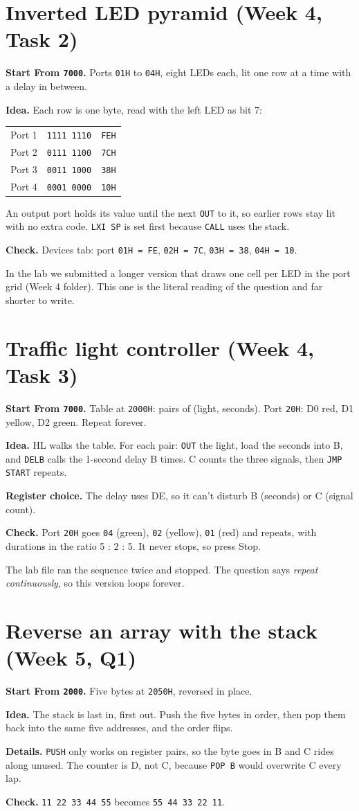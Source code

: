 \documentclass[11pt,a4paper]{article}
\newcommand{\code}[1]{\texttt{#1}}
\newcommand{\prog}[2]{\needspace{12\baselineskip}\section{#1}\label{#2}}
\newcommand{\meta}[2]{\textbf{Start From \code{#1}.} #2\par}
\newcommand{\twocol}[3]{%
\begin{minipage}[t]{#1\textwidth}\vspace{0pt}\end{minipage}\hfill
\begin{minipage}[t]{\dimexpr0.97\textwidth-#1\textwidth\relax}\vspace{0pt}#3\end{minipage}\par}
\begin{document}
\prog{Inverted LED pyramid (Week 4, Task 2)}{p9}
\meta{7000}{Ports \code{01H} to \code{04H}, eight LEDs each, lit one row at a time with a delay in between.}
\twocol{0.34}{w4_t2_pyramid.asm}{%
\textbf{Idea.} Each row is one byte, read with the left LED as bit 7:

\begin{tabular}{@{}lll@{}}
Port 1 & \code{1111 1110} & \code{FEH}\\
Port 2 & \code{0111 1100} & \code{7CH}\\
Port 3 & \code{0011 1000} & \code{38H}\\
Port 4 & \code{0001 0000} & \code{10H}\\
\end{tabular}

An output port holds its value until the next \code{OUT} to it, so earlier rows stay lit with no extra code. \code{LXI SP} is set first because \code{CALL} uses the stack.

\textbf{Check.} Devices tab: port \code{01H = FE}, \code{02H = 7C}, \code{03H = 38}, \code{04H = 10}.

In the lab we submitted a longer version that draws one cell per LED in the port grid (Week 4 folder). This one is the literal reading of the question and far shorter to write.}

\prog{Traffic light controller (Week 4, Task 3)}{p10}
\meta{7000}{Table at \code{2000H}: pairs of (light, seconds). Port \code{20H}: D0 red, D1 yellow, D2 green. Repeat forever.}
\twocol{0.34}{w4_t3_traffic.asm}{%
\textbf{Idea.} HL walks the table. For each pair: \code{OUT} the light, load the seconds into B, and \code{DELB} calls the 1-second delay B times. C counts the three signals, then \code{JMP START} repeats.

\textbf{Register choice.} The delay uses DE, so it can't disturb B (seconds) or C (signal count).

\textbf{Check.} Port \code{20H} goes \code{04} (green), \code{02} (yellow), \code{01} (red) and repeats, with durations in the ratio 5 : 2 : 5. It never stops, so press Stop.

The lab file ran the sequence twice and stopped. The question says \emph{repeat continuously}, so this version loops forever.}

\prog{Reverse an array with the stack (Week 5, Q1)}{p11}
\meta{2000}{Five bytes at \code{2050H}, reversed in place.}
\twocol{0.34}{w5_q1_reverse.asm}{%
\textbf{Idea.} The stack is last in, first out. Push the five bytes in order, then pop them back into the same five addresses, and the order flips.

\textbf{Details.} \code{PUSH} only works on register pairs, so the byte goes in B and C rides along unused. The counter is D, not C, because \code{POP B} would overwrite C every lap.

\textbf{Check.} \code{11 22 33 44 55} becomes \code{55 44 33 22 11}.}
\end{document}
